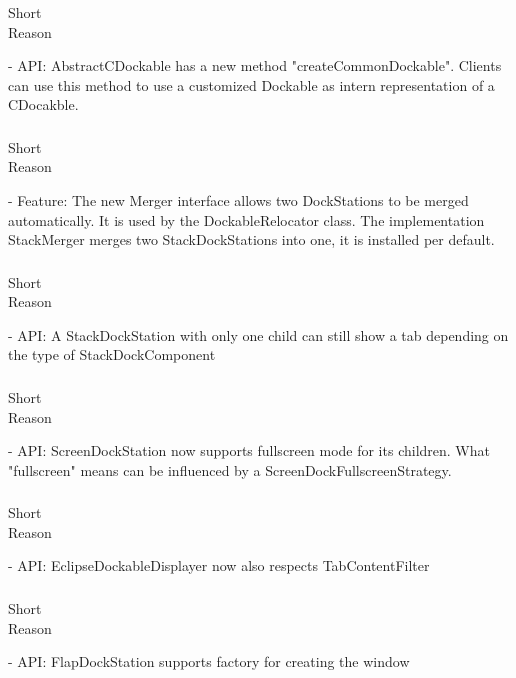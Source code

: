 \documentclass[a4paper,10pt]{article}
\newcommand{\short}{\item[Short]}
\newcommand{\why}{\item[Reason]}
\begin{document}
\subsubsection{}
\begin{description}
 \short 
 \why 
\end{description}
- API: AbstractCDockable has a new method "createCommonDockable". Clients can use this method to use a customized Dockable as intern representation of a CDocakble.
\subsubsection{}
\begin{description}
 \short 
 \why 
\end{description}
- Feature: The new Merger interface allows two DockStations to be merged automatically. It is used by the DockableRelocator class. The implementation StackMerger merges two StackDockStations into one, it is installed per default.
\subsubsection{}
\begin{description}
 \short 
 \why 
\end{description}
- API: A StackDockStation with only one child can still show a tab depending on the type of StackDockComponent
\subsubsection{}
\begin{description}
 \short 
 \why 
\end{description}
- API: ScreenDockStation now supports fullscreen mode for its children. What "fullscreen" means can be influenced by a ScreenDockFullscreenStrategy.
\subsubsection{}
\begin{description}
 \short 
 \why 
\end{description}
- API: EclipseDockableDisplayer now also respects TabContentFilter
\subsubsection{}
\begin{description}
 \short 
 \why 
\end{description}
- API: FlapDockStation supports factory for creating the window
\end{document}

